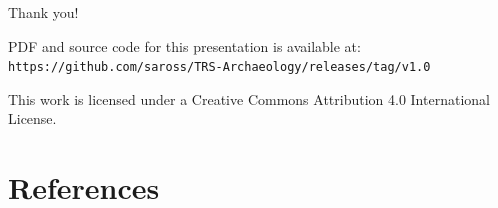 \documentclass[aspectratio=169, 11pt]{beamer} %
\begin{document}
\begin{frame}{Thank you!}

PDF and source code for this presentation is available at: 
\texttt{https://github.com/saross/TRS-Archaeology/releases/tag/v1.0}

This work is licensed under a Creative Commons Attribution 4.0 International License.

\end{frame}

% 


\section{References}

\begin{multicols}{2}[]


\end{multicols}


  
%   
%   
\end{document}
